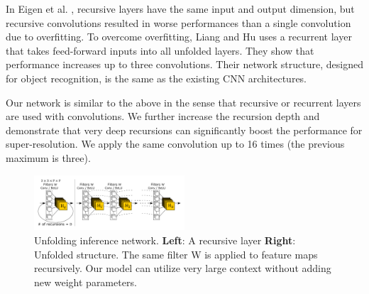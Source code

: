 \documentclass[10pt,twocolumn,letterpaper]{article}
\begin{document}
In Eigen et al. \cite{Eigen2014}, recursive layers have the same input and output dimension, but recursive convolutions resulted in worse performances than a single convolution due to overfitting. To overcome overfitting, Liang and Hu \cite{Liang_2015_CVPR} uses a recurrent layer that takes feed-forward inputs into all unfolded layers. They show that performance increases up to three convolutions. Their network structure, designed for object recognition, is the same as the existing CNN architectures.

Our network is similar to the above in the sense that recursive or recurrent layers are used with convolutions. We further increase the recursion depth and demonstrate that very deep recursions can significantly boost the performance for super-resolution. We apply the same convolution up to 16 times (the previous maximum is three). 

\begin{figure}[t]
	\includegraphics[width=0.5\textwidth]{figs/f2}
	\caption {Unfolding inference network. \textbf{Left}: A recursive layer \textbf{Right}: Unfolded structure. The same filter W is applied to feature maps recursively. Our model can utilize very large context without adding new weight parameters. }
	\label{fig:inference_network}
\end{figure}
\end{document}

